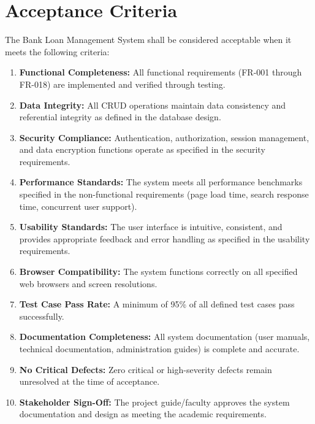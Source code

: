 \section{Acceptance Criteria}

The Bank Loan Management System shall be considered acceptable when it meets the following criteria:

\begin{enumerate}
  \item \textbf{Functional Completeness:} All functional requirements (FR-001 through FR-018) are implemented and verified through testing.
  \item \textbf{Data Integrity:} All CRUD operations maintain data consistency and referential integrity as defined in the database design.
  \item \textbf{Security Compliance:} Authentication, authorization, session management, and data encryption functions operate as specified in the security requirements.
  \item \textbf{Performance Standards:} The system meets all performance benchmarks specified in the non-functional requirements (page load time, search response time, concurrent user support).
  \item \textbf{Usability Standards:} The user interface is intuitive, consistent, and provides appropriate feedback and error handling as specified in the usability requirements.
  \item \textbf{Browser Compatibility:} The system functions correctly on all specified web browsers and screen resolutions.
  \item \textbf{Test Case Pass Rate:} A minimum of 95\% of all defined test cases pass successfully.
  \item \textbf{Documentation Completeness:} All system documentation (user manuals, technical documentation, administration guides) is complete and accurate.
  \item \textbf{No Critical Defects:} Zero critical or high-severity defects remain unresolved at the time of acceptance.
  \item \textbf{Stakeholder Sign-Off:} The project guide/faculty approves the system documentation and design as meeting the academic requirements.
\end{enumerate}
